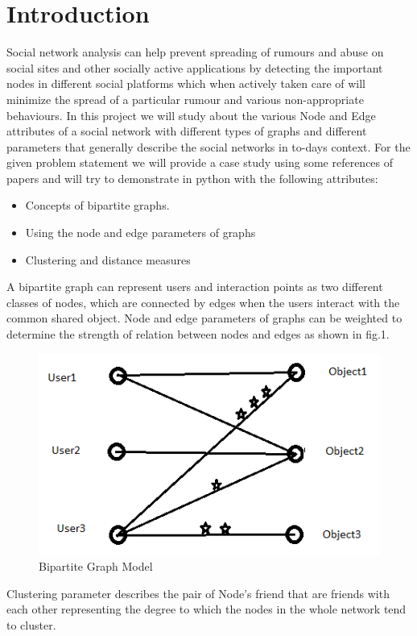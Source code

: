 \documentclass{article}
\begin{document}
\section{Introduction}
Social network analysis can help prevent spreading of rumours and abuse on social sites and other socially active applications by detecting the important nodes in different social platforms which when actively taken care of will minimize the spread of a particular rumour and various non-appropriate behaviours. In this project we will study about the various Node and Edge attributes of a social network with different types of graphs and different parameters that generally describe the social networks in to-days context. For the given problem statement we will provide a case study using some references of papers and will try to demonstrate in python with the following attributes:
\begin{itemize}
  \item Concepts of bipartite graphs.
  \item Using the node and edge parameters of graphs
  \item Clustering and distance measures
\end{itemize}
A bipartite graph can represent users and interaction points as two different classes of nodes, which are connected by edges when the users interact with the common shared object.
Node and edge parameters of graphs can be weighted to determine the strength of relation between nodes and edges as shown in fig.1.
\begin{figure}[ht]
\centering
\includegraphics[scale=0.6]{bipar2.png}
\caption{Bipartite Graph Model}
\end{figure}
Clustering parameter describes the pair of Node’s friend that are friends with each other representing the degree to which the nodes in the whole network tend to cluster.
\end{document}

